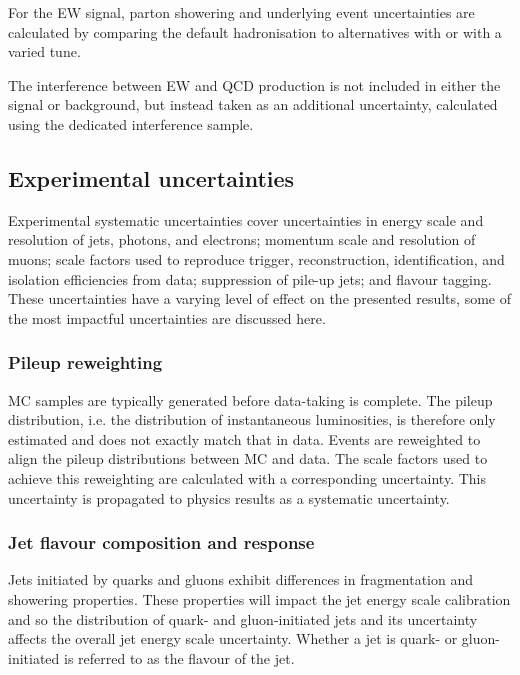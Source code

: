 For the \ac{EW} signal, parton showering and underlying event uncertainties are
calculated by comparing the default \pythia hadronisation to alternatives with
\herwig or with a varied \pythia tune.

The interference between \ac{EW} and \ac{QCD} \Zy production is not included in
either the signal or background, but instead taken as an additional uncertainty,
calculated using the dedicated interference sample.


\subsection{Experimental uncertainties}

Experimental systematic uncertainties cover uncertainties in energy scale and
resolution of jets, photons, and electrons; momentum scale and resolution of
muons; scale factors used to reproduce trigger, reconstruction, identification,
and isolation efficiencies from data; suppression of pile-up jets; and flavour
tagging. These uncertainties have a varying level of effect on the presented
results, some of the most impactful uncertainties are discussed here.

\subsubsection{Pileup reweighting}

\ac{MC} samples are typically generated before data-taking is complete. The
pileup distribution, i.e. the distribution of instantaneous luminosities, is
therefore only estimated and does not exactly match that in data. Events are
reweighted to align the pileup distributions between \ac{MC} and data. The scale
factors used to achieve this reweighting are calculated with a corresponding
uncertainty. This uncertainty is propagated to physics results as a systematic
uncertainty.

\subsubsection{Jet flavour composition and response}
\label{sec:methods-systematics-jet-flavour}

Jets initiated by quarks and gluons exhibit differences in fragmentation and
showering properties. These properties will impact the jet energy scale
calibration and so the distribution of quark- and gluon-initiated jets and its
uncertainty affects the overall jet energy scale uncertainty. Whether a jet is
quark- or gluon-initiated is referred to as the flavour of the jet.

